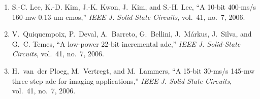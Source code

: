 \begin{enumerate}
\item
S.-C. Lee, K.-D. Kim, J.-K. Kwon, J.~Kim, and S.-H. Lee, ``A 10-bit 400-ms/s
  160-mw 0.13-um cmos,'' \emph{{IEEE} J. Solid-State Circuits}, vol.~41, no.~7,
  2006.

\item
V.~Quiquempoix, P.~Deval, A.~Barreto, G.~Bellini, J.~Márkus, J.~Silva, and
  G.~C. Temes, ``A low-power 22-bit incremental adc,'' \emph{{IEEE} J.
  Solid-State Circuits}, vol.~41, no.~7, 2006.

\item
H.~van~der Ploeg, M.~Vertregt, and M.~Lammers, ``A 15-bit 30-ms/s 145-mw
  three-step adc for imaging applications,'' \emph{{IEEE} J. Solid-State
  Circuits}, vol.~41, no.~7, 2006.

\end{enumerate}


